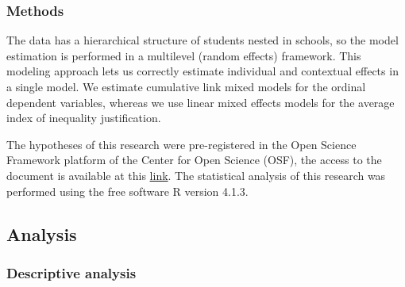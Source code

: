 \documentclass[
  letterpaper,
  DIV=11,
  numbers=noendperiod]{scrartcl}
\begin{document}
\subsubsection{Methods}\label{methods-1}

The data has a hierarchical structure of students nested in schools, so
the model estimation is performed in a multilevel (random effects)
framework. This modeling approach lets us correctly estimate individual
and contextual effects in a single model. We estimate cumulative link
mixed models for the ordinal dependent variables, whereas we use linear
mixed effects models for the average index of inequality justification.

The hypotheses of this research were pre-registered in the Open Science
Framework platform of the Center for Open Science (OSF), the access to
the document is available at this
\href{https://doi.org/10.17605/OSF.IO/UFSDV}{link}. The statistical
analysis of this research was performed using the free software R
version 4.1.3.

\subsection{Analysis}\label{analysis}

\subsubsection{Descriptive analysis}\label{descriptive-analysis}
\end{document}
